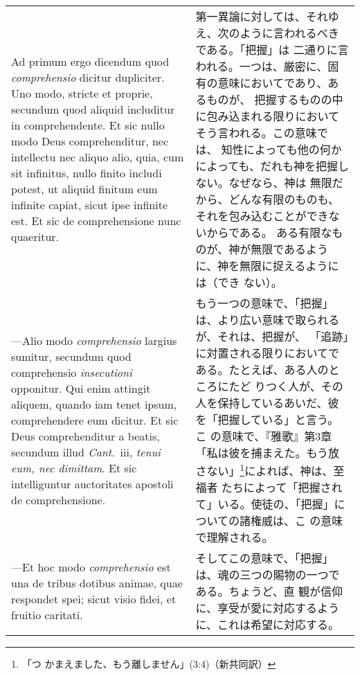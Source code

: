 \documentclass[10pt]{jsarticle} %
\begin{document}
\begin{longtable}{p{21em}p{21em}}
\\

{\sc Ad primum ergo dicendum} quod {\it comprehensio} dicitur
dupliciter. Uno modo, stricte et proprie, secundum quod aliquid
includitur in comprehendente. Et sic nullo modo Deus comprehenditur,
nec intellectu nec aliquo alio, quia, cum sit infinitus, nullo finito
includi potest, ut aliquid finitum eum infinite capiat, sicut ipse
infinite est. Et sic de comprehensione nunc quaeritur.

&

第一異論に対しては、それゆえ、次のように言われるべきである。「把握」は
二通りに言われる。一つは、厳密に、固有の意味においてであり、あるものが、
把握するものの中に包み込まれる限りにおいてそう言われる。この意味では、
知性によっても他の何かによっても、だれも神を把握しない。なぜなら、神は
無限だから、どんな有限のものも、それを包み込むことができないからである。
ある有限なものが、神が無限であるように、神を無限に捉えるようには（でき
ない）。

\\

---Alio modo {\it comprehensio} largius sumitur, secundum quod
comprehensio {\it insecutioni} opponitur. Qui enim attingit aliquem,
quando iam tenet ipsum, comprehendere eum dicitur. Et sic Deus
comprehenditur a beatis, secundum illud {\it Cant}.\ {\sc iii}, {\it
tenui eum, nec dimittam}. Et sic intelliguntur auctoritates apostoli
de comprehensione.

&

もう一つの意味で、「把握」は、より広い意味で取られるが、それは、把握が、
「追跡」に対置される限りにおいてである。たとえば、ある人のところにたど
りつく人が、その人を保持しているあいだ、彼を「把握している」と言う。こ
の意味で、『雅歌』第3章「私は彼を捕まえた。もう放さない」\footnote{「つ
かまえました、もう離しません」(3:4)（新共同訳）}によれば、神は、至福者
たちによって「把握されて」いる。使徒の、「把握」についての諸権威は、こ
の意味で理解される。

\\

---Et hoc modo {\it comprehensio} est una de tribus dotibus animae,
quae respondet spei; sicut visio fidei, et fruitio caritati.

&

そしてこの意味で、「把握」は、魂の三つの賜物の一つである。ちょうど、直
観が信仰に、享受が愛に対応するように、これは希望に対応する。

\\


\end{longtable}
\end{document}
